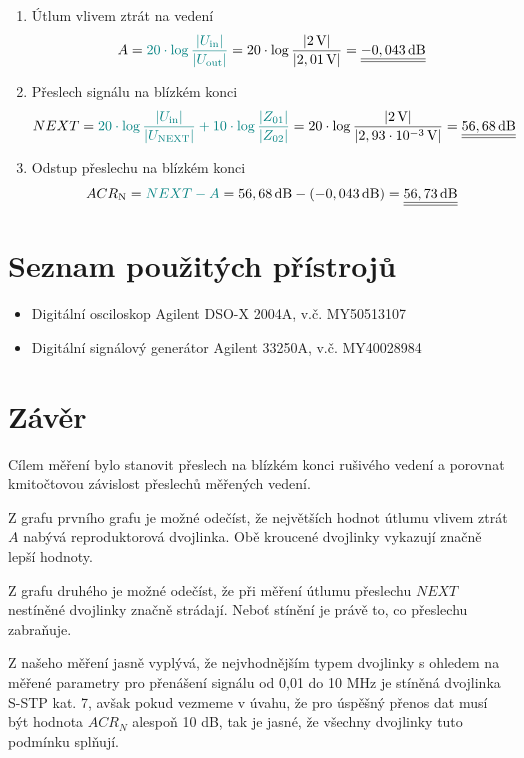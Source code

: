 \documentclass[a4paper, czech]{article}
\begin{document}
\begin{enumerate}
    \item Útlum vlivem ztrát na vedení
    \begin{multline*}
        A = \textcolor{teal}{20 \cdot \log \frac{\left|U_\text{in}\right|}{\left|U_\text{out}\right|}} = 20 \cdot \log \frac{\left|2\,\text{V}\right|}{\left|2,01\,\text{V}\right|} = \underline{\underline{-0,043\,\text{dB}}} \hfill
    \end{multline*}
    \item Přeslech signálu na blízkém konci
    \begin{multline*}
        NEXT = \textcolor{teal}{20 \cdot \log \frac{\left|U_\text{in}\right|}{\left|U_\text{NEXT}\right|} + 10 \cdot \log \frac{\left|Z_{01}\right|}{\left|Z_{02}\right|}} = 20 \cdot \log \frac{\left|2\,\text{V}\right|}{\left|2,93 \cdot 10^{-3}\,\text{V}\right|} = \underline{\underline{56,68\,\text{dB}}} \hfill
    \end{multline*}
    \item Odstup přeslechu na blízkém konci
    \begin{multline*}
        ACR_\text{N} = \textcolor{teal}{NEXT - A} = 56,68\,\text{dB} - (-0,043\,\text{dB}) =\underline{\underline{56,73\,\text{dB}}} \hfill
    \end{multline*}
\end{enumerate}

\section{Seznam použitých přístrojů}

\begin{itemize}
    \item Digitální osciloskop Agilent DSO-X 2004A, v.č. MY50513107
    \item Digitální signálový generátor Agilent 33250A, v.č. MY40028984
\end{itemize}

\section{Závěr}

Cílem měření bylo stanovit přeslech na blízkém konci rušivého vedení a porovnat kmitočtovou závislost přeslechů měřených vedení.

Z grafu prvního grafu je možné odečíst, že největších hodnot útlumu vlivem ztrát $A$ nabývá reproduktorová dvojlinka. Obě kroucené dvojlinky vykazují značně lepší hodnoty.

Z grafu druhého je možné odečíst, že při měření útlumu přeslechu $NEXT$ nestíněné dvojlinky značně strádají. Neboť stínění je právě to, co přeslechu zabraňuje.

Z našeho měření jasně vyplývá, že nejvhodnějším typem dvojlinky s ohledem na měřené parametry pro přenášení signálu od 0,01 do 10 MHz je stíněná dvojlinka S-STP kat. 7, avšak pokud vezmeme v úvahu, že pro úspěšný přenos dat musí být hodnota $ACR_N$ alespoň 10 dB, tak je jasné, že všechny dvojlinky tuto podmínku splňují. 
\end{document}

